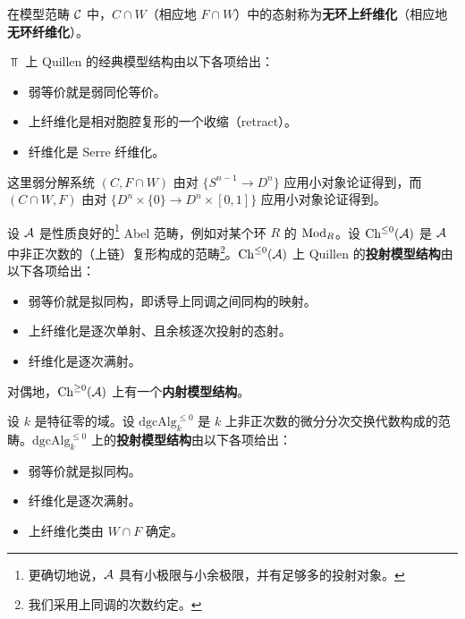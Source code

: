 \begin{definition}\label{L2-2.6}
在模型范畴 $\mathcal{C}$ 中，$C\cap W$（相应地 $F\cap W$）中的态射称为\textbf{无环上纤维化}（相应地\textbf{无环纤维化}）。
\end{definition}


\begin{example}\label{L2-2.7}
$\Top$ 上 Quillen 的经典模型结构由以下各项给出：
\begin{itemize}[leftmargin=2.2em,itemsep=0.1em]
\item[(W)] 弱等价就是弱同伦等价。
\item[(C)] 上纤维化是相对胞腔复形的一个收缩（retract）。
\item[(F)] 纤维化是 Serre 纤维化。
\end{itemize}
这里弱分解系统 $(C,F\cap W)$ 由对 $\{S^{n-1}\to D^n\}$ 应用小对象论证得到，而 $(C\cap W,F)$ 由对 $\{D^n\times\{0\}\to D^n\times[0,1]\}$ 应用小对象论证得到。
\end{example}

\begin{example}\label{L2-2.8}
设 $\mathcal{A}$ 是性质良好的\footnote{更确切地说，$\mathcal{A}$ 具有小极限与小余极限，并有足够多的投射对象。} Abel 范畴，例如对某个环 $R$ 的 $\operatorname{Mod}_R$。设 $\operatorname{Ch}^{\le0}(\mathcal{A})$ 是 $\mathcal{A}$ 中非正次数的（上链）复形构成的范畴\footnote{我们采用上同调的次数约定。}。$\operatorname{Ch}^{\le0}(\mathcal{A})$ 上 Quillen 的\textbf{投射模型结构}由以下各项给出：
\begin{itemize}[leftmargin=2.2em,itemsep=0.1em]
\item[(W)] 弱等价就是拟同构，即诱导上同调之间同构的映射。
\item[(C)] 上纤维化是逐次单射、且余核逐次投射的态射。
\item[(F)] 纤维化是逐次满射。
\end{itemize}
对偶地，$\operatorname{Ch}^{\ge0}(\mathcal{A})$ 上有一个\textbf{内射模型结构}。
\end{example}

\begin{example}\label{L2-2.9}
设 $k$ 是特征零的域。设 $\mathrm{dgcAlg}^{\le0}_{k}$ 是 $k$ 上非正次数的微分分次交换代数构成的范畴。$\mathrm{dgcAlg}^{\le0}_{k}$ 上的\textbf{投射模型结构}由以下各项给出：
\begin{itemize}[leftmargin=2.2em,itemsep=0.1em]
\item[(W)] 弱等价就是拟同构。
\item[(F)] 纤维化是逐次满射。
\item[(C)] 上纤维化类由 $W\cap F$ 确定。
\end{itemize}
\end{example}

